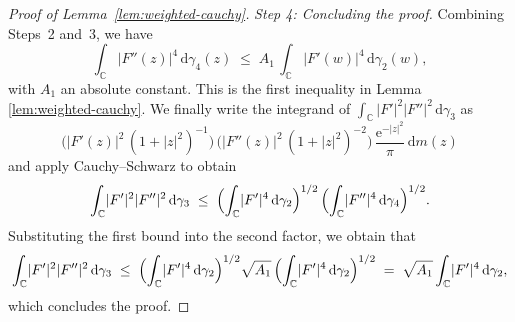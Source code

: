 \documentclass[a4paper,11pt,reqno]{amsart}
\numberwithin{equation}{section}
\theoremstyle{plain} %
\theoremstyle{definition} %
\theoremstyle{remark}
\newcommand{\C}{\mathbb{C}}
\newcommand{\abs}[1]{\lvert #1 \rvert}
\newcommand{\dd}{\mathrm{d}}
\newcommand{\ee}{\mathrm{e}}
\begin{document}
\begin{proof}[Proof of Lemma~\ref{lem:weighted-cauchy}]
\noindent\emph{Step 4: Concluding the proof.}\;
Combining Steps~2 and~3, we have
\[
\int_{\C}\abs{F''(z)}^{4}\,\dd\gamma_{4}(z)
\;\le\;
A_{1}\,\int_{\C}\abs{F'(w)}^{4}\,\dd\gamma_{2}(w),
\]
with $A_{1}$ an absolute constant. This is the first inequality in Lemma \ref{lem:weighted-cauchy}. We finally write the integrand of
$\int_{\C}\abs{F'}^{2}\abs{F''}^{2}\,\dd\gamma_{3}$ as
\[
\bigl(\abs{F'(z)}^{2}\,(1+\abs{z}^{2})^{-1}\bigr)\,
\bigl(\abs{F''(z)}^{2}\,(1+\abs{z}^{2})^{-2}\bigr)\,
\frac{\ee^{-\abs{z}^{2}}}{\pi}\,\dd m(z)
\]
and apply Cauchy--Schwarz to obtain
\[
\int_{\C}\abs{F'}^{2}\abs{F''}^{2}\,\dd\gamma_{3}
\;\le\;
\Bigl(\int_{\C}\abs{F'}^{4}\,\dd\gamma_{2}\Bigr)^{1/2}\,
\Bigl(\int_{\C}\abs{F''}^{4}\,\dd\gamma_{4}\Bigr)^{1/2}.
\]
Substituting the first bound into the second factor, we obtain that
\[
\int_{\C}\abs{F'}^{2}\abs{F''}^{2}\,\dd\gamma_{3}
\;\le\;
\Bigl(\int_{\C}\abs{F'}^{4}\,\dd\gamma_{2}\Bigr)^{1/2}
\sqrt{A_{1}}\,\Bigl(\int_{\C}\abs{F'}^{4}\,\dd\gamma_{2}\Bigr)^{1/2}
\;=\;
\sqrt{A_{1}}\int_{\C}\abs{F'}^{4}\,\dd\gamma_{2},
\]
which concludes the proof.
\end{proof}
\end{document}
